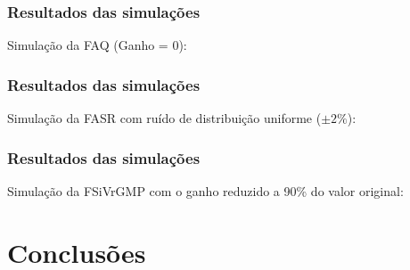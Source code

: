 \documentclass{beamer}
\begin{document}
\begin{frame}
    \frametitle{Resultados das simulações}

\footnotesize Simulação da FAQ (Ganho = 0):

\begin{figure}[htb]
\footnotesize
\centering
\scalebox{0.68}{}
\end{figure}

\end{frame}

\begin{frame}
    \frametitle{Resultados das simulações}

\footnotesize Simulação da FASR com ruído de distribuição uniforme ($\pm 2\%$):

\begin{figure}[htb] 
\footnotesize 
\centering 
\scalebox{0.68}{}
\end{figure}
    
\end{frame}

\begin{frame}
    \frametitle{Resultados das simulações}

\footnotesize Simulação da FSiVrGMP com o ganho reduzido a 90\% do valor
original:

\begin{figure}[htb] 
\footnotesize 
\centering 
\scalebox{0.68}{}
\end{figure}
    
\end{frame}

\section{Conclusões}
\end{document}

